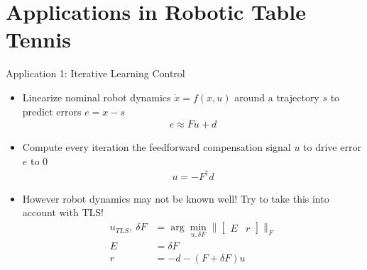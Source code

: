 \documentclass[handout]{beamer}
\begin{document}
\section{Applications in Robotic Table Tennis}
%
\begin{frame}{Application 1: Iterative Learning Control}
\begin{itemize}
\item Linearize nominal robot dynamics $\dot{x} = f(x,u)$ around a trajectory $s$ to predict errors $e = x - s$
\begin{equation}
\begin{aligned}
e \approx Fu + d
\end{aligned}
\end{equation}
\item Compute every iteration the feedforward compensation signal $u$ to drive error $e$ to $0$
\begin{equation}
\begin{aligned}
u = -F^{\dagger}d
\end{aligned}
\end{equation}
\item However robot dynamics may not be known well! Try to take this into account with TLS!
\begin{equation}
\begin{aligned}
u_{TLS}, \ \delta F &= \arg\min_{u,\delta F} \|\begin{bmatrix}E & r \end{bmatrix} \|_{F} \\
E &= \delta F \\
r &= -d - (F + \delta F)u
\end{aligned}
\end{equation}
\end{itemize}
\end{frame}
%
\end{document}
